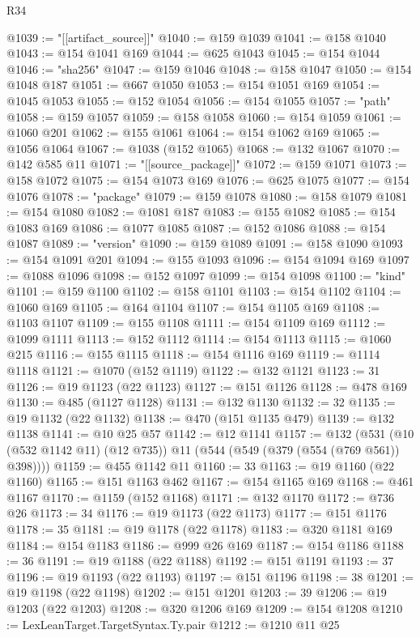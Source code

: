 \begin{lexlean}{R34}
\begin{coremodule}
@1039 := "[[artifact_source]]"
@1040 := @159 @1039
@1041 := @158 @1040
@1043 := @154 @1041 @169
@1044 := @625 @1043
@1045 := @154 @1044
@1046 := "sha256"
@1047 := @159 @1046
@1048 := @158 @1047
@1050 := @154 @1048 @187
@1051 := @667 @1050
@1053 := @154 @1051 @169
@1054 := @1045 @1053
@1055 := @152 @1054
@1056 := @154 @1055
@1057 := "path"
@1058 := @159 @1057
@1059 := @158 @1058
@1060 := @154 @1059
@1061 := @1060 @201
@1062 := @155 @1061
@1064 := @154 @1062 @169
@1065 := @1056 @1064
@1067 := @1038 (@152 @1065)
@1068 := @132 @1067
@1070 := @142 @585 @11
@1071 := "[[source_package]]"
@1072 := @159 @1071
@1073 := @158 @1072
@1075 := @154 @1073 @169
@1076 := @625 @1075
@1077 := @154 @1076
@1078 := "package"
@1079 := @159 @1078
@1080 := @158 @1079
@1081 := @154 @1080
@1082 := @1081 @187
@1083 := @155 @1082
@1085 := @154 @1083 @169
@1086 := @1077 @1085
@1087 := @152 @1086
@1088 := @154 @1087
@1089 := "version"
@1090 := @159 @1089
@1091 := @158 @1090
@1093 := @154 @1091 @201
@1094 := @155 @1093
@1096 := @154 @1094 @169
@1097 := @1088 @1096
@1098 := @152 @1097
@1099 := @154 @1098
@1100 := "kind"
@1101 := @159 @1100
@1102 := @158 @1101
@1103 := @154 @1102
@1104 := @1060 @169
@1105 := @164 @1104
@1107 := @154 @1105 @169
@1108 := @1103 @1107
@1109 := @155 @1108
@1111 := @154 @1109 @169
@1112 := @1099 @1111
@1113 := @152 @1112
@1114 := @154 @1113
@1115 := @1060 @215
@1116 := @155 @1115
@1118 := @154 @1116 @169
@1119 := @1114 @1118
@1121 := @1070 (@152 @1119)
@1122 := @132 @1121
@1123 := 31
@1126 := @19 @1123 (@22 @1123)
@1127 := @151 @1126
@1128 := @478 @169
@1130 := @485 (@1127 @1128)
@1131 := @132 @1130
@1132 := 32
@1135 := @19 @1132 (@22 @1132)
@1138 := @470 (@151 @1135 @479)
@1139 := @132 @1138
@1141 := @10 @25 @57
@1142 := @12 @1141
@1157 := @132
    (@531 (@10 (@532 @1142 @11) (@12 @735)) @11 (@544 (@549 (@379 (@554 (@769 @561)) @398))))
@1159 := @455 @1142 @11
@1160 := 33
@1163 := @19 @1160 (@22 @1160)
@1165 := @151 @1163 @462
@1167 := @154 @1165 @169
@1168 := @461 @1167
@1170 := @1159 (@152 @1168)
@1171 := @132 @1170
@1172 := @736 @26
@1173 := 34
@1176 := @19 @1173 (@22 @1173)
@1177 := @151 @1176
@1178 := 35
@1181 := @19 @1178 (@22 @1178)
@1183 := @320 @1181 @169
@1184 := @154 @1183
@1186 := @999 @26 @169
@1187 := @154 @1186
@1188 := 36
@1191 := @19 @1188 (@22 @1188)
@1192 := @151 @1191
@1193 := 37
@1196 := @19 @1193 (@22 @1193)
@1197 := @151 @1196
@1198 := 38
@1201 := @19 @1198 (@22 @1198)
@1202 := @151 @1201
@1203 := 39
@1206 := @19 @1203 (@22 @1203)
@1208 := @320 @1206 @169
@1209 := @154 @1208
@1210 := LexLeanTarget.TargetSyntax.Ty.pair
@1212 := @1210 @11 @25

\end{coremodule}
\end{lexlean}
